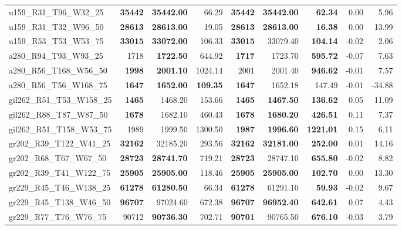 \documentclass{singlecol-new}
\begin{document}
\begin{scriptsize}
\begin{longtable}{lrrrrrrrr}
		u159\_R31\_T96\_W32\_25 & \textbf{35442} & \textbf{35442.00} & 66.29 & \textbf{35442} & \textbf{35442.00} & \textbf{62.34} & 0.00 & 5.96 \\
		u159\_R31\_T32\_W96\_50 & \textbf{28613} & \textbf{28613.00} & 19.05 & \textbf{28613} & \textbf{28613.00} & \textbf{16.38} & 0.00 & 13.99 \\
		u159\_R53\_T53\_W53\_75 & \textbf{33015} & \textbf{33072.00} & 106.33 & \textbf{33015} & 33079.40 & \textbf{104.14} & -0.02 & 2.06 \\
		a280\_R94\_T93\_W93\_25 & 1718 & \textbf{1722.50} & 644.92 & \textbf{1717} & 1723.70 & \textbf{595.72} & -0.07 & 7.63 \\
		a280\_R56\_T168\_W56\_50 & \textbf{1998} & \textbf{2001.10} & 1024.14 & 2001 & 2001.40 & \textbf{946.62} & -0.01 & 7.57 \\
		a280\_R56\_T56\_W168\_75 & \textbf{1647} & \textbf{1652.00} & \textbf{109.35} & \textbf{1647} & 1652.18 & 147.49 & -0.01 & -34.88 \\
		gil262\_R51\_T53\_W158\_25 & \textbf{1465} & 1468.20 & 153.66 & \textbf{1465} & \textbf{1467.50} & \textbf{136.62} & 0.05 & 11.09 \\
		gil262\_R88\_T87\_W87\_50 & \textbf{1678} & 1682.10 & 460.43 & \textbf{1678} & \textbf{1680.20} & \textbf{426.51} & 0.11 & 7.37 \\
		gil262\_R51\_T158\_W53\_75 & 1989 & 1999.50 & 1300.50 & \textbf{1987} & \textbf{1996.60} & \textbf{1221.01} & 0.15 & 6.11 \\
		gr202\_R39\_T122\_W41\_25 & \textbf{32162} & 32185.20 & 293.56 & \textbf{32162} & \textbf{32181.00} & \textbf{252.00} & 0.01 & 14.16 \\
		gr202\_R68\_T67\_W67\_50 & \textbf{28723} & \textbf{28741.70} & 719.21 & \textbf{28723} & 28747.10 & \textbf{655.80} & -0.02 & 8.82 \\
		gr202\_R39\_T41\_W122\_75 & \textbf{25905} & \textbf{25905.00} & 118.46 & \textbf{25905} & \textbf{25905.00} & \textbf{102.70} & 0.00 & 13.30 \\
		gr229\_R45\_T46\_W138\_25 & \textbf{61278} & \textbf{61280.50} & 66.34 & \textbf{61278} & 61291.10 & \textbf{59.93} & -0.02 & 9.67 \\
		gr229\_R45\_T138\_W46\_50 & \textbf{96707} & 97024.60 & 672.38 & \textbf{96707} & \textbf{96952.40} & \textbf{642.61} & 0.07 & 4.43 \\
		gr229\_R77\_T76\_W76\_75 & 90712 & \textbf{90736.30} & 702.71 & \textbf{90701} & 90765.50 & \textbf{676.10} & -0.03 & 3.79 \\

\end{longtable}
\end{scriptsize}
\end{document}
